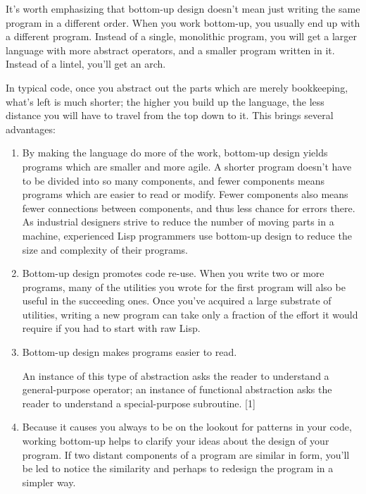 It's worth emphasizing that bottom-up design doesn't mean
just writing the same program in a different order.  When you
work bottom-up, you usually end up with a different program.
Instead of a single, monolithic program,
you will get a larger language with more abstract operators,   
and a smaller program written in it.  Instead of a lintel,
you'll get an arch.


In typical code, once you abstract out the parts which are
merely bookkeeping, what's left is much shorter;
the higher you build up the language, the less distance you
will have to travel from the top down to it.
This brings several advantages:


\begin{enumerate}
\item  By making the language do more of the work, bottom-up design
yields programs which are smaller and more agile.  A shorter
program doesn't have to be divided into so many components, and
fewer components means programs which are easier to read or
modify.  Fewer components also means fewer connections between   
components, and thus less chance for errors there.  As
industrial designers strive to reduce the number of moving parts
in a machine, experienced Lisp programmers use bottom-up design
to reduce the size and complexity of their programs.


\item  Bottom-up design promotes code re-use.
When you write two
or more programs, many of the utilities you wrote for the first
program will also be useful in the succeeding ones.  Once you've  
acquired a large substrate of utilities, writing a new program can
take only a fraction of the effort it would require if you had to 
start with raw Lisp.


\item  Bottom-up design makes programs easier to read.

An instance of this type
of abstraction asks the reader to understand a general-purpose operator;
an instance of functional abstraction asks the reader to understand
a special-purpose subroutine. [1]


\item  Because it causes you always to be on the lookout for patterns
in your code, working bottom-up helps to clarify your ideas about
the design of your program.  If two distant components of a program
are similar in form, you'll be led to notice the similarity and
perhaps to redesign the program in a simpler way.

\end{enumerate}


